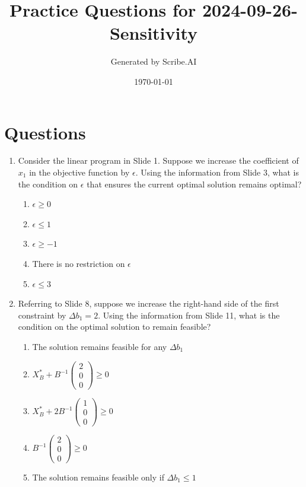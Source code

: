 \documentclass{article}%
\title{Practice Questions for 2024{-}09{-}26{-}Sensitivity}%
\author{Generated by Scribe.AI}%
\date{\today}%
\begin{document}
%
\normalsize%
\maketitle%
\section{Questions}%
\label{sec:Questions}%
\begin{enumerate}%
\item Consider the linear program in Slide 1.  Suppose we increase the coefficient of $x_1$ in the objective function by $\epsilon$. Using the information from Slide 3, what is the condition on $\epsilon$ that ensures the current optimal solution remains optimal?%
\begin{enumerate}%
\item $\epsilon \ge 0$%
\item $\epsilon \le 1$%
\item $\epsilon \ge -1$%
\item There is no restriction on $\epsilon$%
\item $\epsilon \le 3$%
\end{enumerate}%
\vspace{1em}%
\item Referring to Slide 8, suppose we increase the right-hand side of the first constraint by $\Delta b_1 = 2$. Using the information from Slide 11, what is the condition on the optimal solution to remain feasible?%
\begin{enumerate}%
\item The solution remains feasible for any $\Delta b_1$%
\item $X_B^* + B^{-1} \begin{pmatrix} 2 \\ 0 \\ 0 \end{pmatrix} \ge 0$%
\item $X_B^* + 2B^{-1} \begin{pmatrix} 1 \\ 0 \\ 0 \end{pmatrix} \ge 0$%
\item $B^{-1} \begin{pmatrix} 2 \\ 0 \\ 0 \end{pmatrix} \ge 0$%
\item The solution remains feasible only if $\Delta b_1 \le 1$%
\end{enumerate}%

\end{enumerate}
\end{document}
